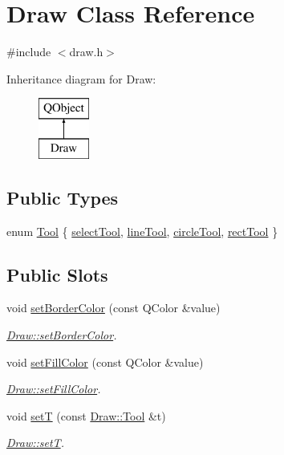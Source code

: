 \hypertarget{class_draw}{}\section{Draw Class Reference}
\label{class_draw}


{\ttfamily \#include $<$draw.\+h$>$}

Inheritance diagram for Draw\+:\begin{figure}[H]
\begin{center}
\leavevmode
\includegraphics[height=2.000000cm]{class_draw}
\end{center}
\end{figure}
\subsection*{Public Types}
\begin{DoxyCompactItemize}
\item 
enum \hyperlink{class_draw_aef97a848de7a634c35c3ce678be88b9b}{Tool} \{ \hyperlink{class_draw_aef97a848de7a634c35c3ce678be88b9bae4a005b9e5843075e8e0a77b7a3d7159}{select\+Tool}, 
\hyperlink{class_draw_aef97a848de7a634c35c3ce678be88b9ba28e42983eabb4d975227fb7b365c3295}{line\+Tool}, 
\hyperlink{class_draw_aef97a848de7a634c35c3ce678be88b9baf76785749efd3ceaf7fa226d8cc0de66}{circle\+Tool}, 
\hyperlink{class_draw_aef97a848de7a634c35c3ce678be88b9ba7778b9c2175c8a25f395a1565c5dac30}{rect\+Tool}
 \}
\end{DoxyCompactItemize}
\subsection*{Public Slots}
\begin{DoxyCompactItemize}
\item 
void \hyperlink{class_draw_a960270765705698a6663fdfe93356d17}{set\+Border\+Color} (const Q\+Color \&value)
\begin{DoxyCompactList}\small\item\em \hyperlink{class_draw_a960270765705698a6663fdfe93356d17}{Draw\+::set\+Border\+Color}. \end{DoxyCompactList}\item 
void \hyperlink{class_draw_a7d802038dd6aa2afe1a8570dbe681136}{set\+Fill\+Color} (const Q\+Color \&value)
\begin{DoxyCompactList}\small\item\em \hyperlink{class_draw_a7d802038dd6aa2afe1a8570dbe681136}{Draw\+::set\+Fill\+Color}. \end{DoxyCompactList}\item 
void \hyperlink{class_draw_af955c348f57d49fdb861ad82f485b902}{setT} (const \hyperlink{class_draw_aef97a848de7a634c35c3ce678be88b9b}{Draw\+::\+Tool} \&t)
\begin{DoxyCompactList}\small\item\em \hyperlink{class_draw_af955c348f57d49fdb861ad82f485b902}{Draw\+::setT}. \end{DoxyCompactList}\end{DoxyCompactItemize}
